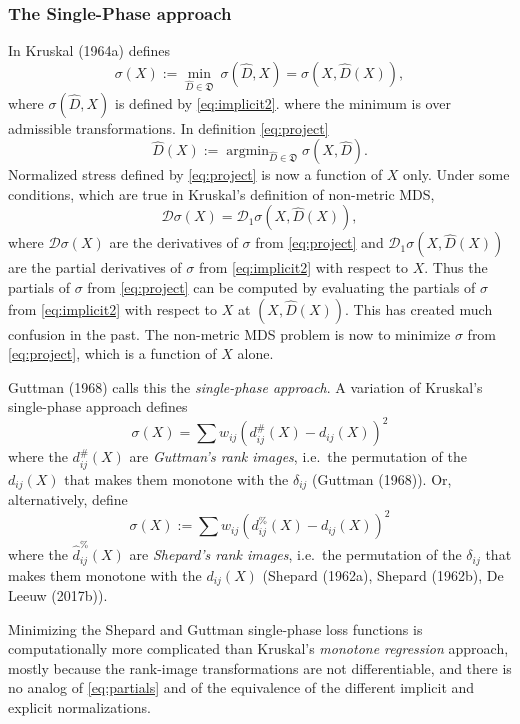\documentclass[
  12pt,
]{article}
\begin{document}
\subsubsection{The Single-Phase approach}\label{the-single-phase-approach}

In Kruskal (1964a) defines \begin{equation}
\sigma(X):=\min_{\hat D\in\mathfrak{D}}\ \sigma(\hat D,X)=\sigma(X,\hat D(X)),
\label{eq:project}
\end{equation} where \(\sigma(\hat D,X)\) is defined by
\eqref{eq:implicit2}. where the minimum is over admissible
transformations. In definition \eqref{eq:project} \begin{equation}
\hat D(X):=\mathop{\text{argmin}}_{\hat D\in\mathfrak{D}}\sigma(X, \hat D).
\label{eq:optscal}
\end{equation} Normalized stress defined by \eqref{eq:project} is now a
function of \(X\) only. Under some conditions, which are true in Kruskal's
definition of non-metric MDS, \begin{equation}
\mathcal{D}\sigma(X)=\mathcal{D}_1\sigma(X,\hat D(X)),
\label{eq:partials}
\end{equation} where \(\mathcal{D}\sigma(X)\) are the derivatives of
\(\sigma\) from \eqref{eq:project} and \(\mathcal{D}_1\sigma(X,\hat D(X))\)
are the partial derivatives of \(\sigma\) from \eqref{eq:implicit2} with
respect to \(X\). Thus the partials of \(\sigma\) from \eqref{eq:project} can
be computed by evaluating the partials of \(\sigma\) from
\eqref{eq:implicit2} with respect to \(X\) at \((X,\hat D(X))\). This has
created much confusion in the past. The non-metric MDS problem is now to
minimize \(\sigma\) from \eqref{eq:project}, which is a function of \(X\)
alone.

Guttman (1968) calls this the \emph{single-phase approach}. A variation of
Kruskal's single-phase approach defines \[
\sigma(X)=\sum   w_{ij}(d_{ij}^\#(X)-d_{ij}(X))^2
\] where the \(d_{ij}^\#(X)\) are \emph{Guttman's rank images}, i.e.~the
permutation of the \(d_{ij}(X)\) that makes them monotone with the
\(\delta_{ij}\) (Guttman (1968)). Or, alternatively, define \[
\sigma(X):=\sum   w_{ij}(d_{ij}^\%(X)-d_{ij}(X))^2
\] where the \(\hat d_{ij}^\%(X)\) are \emph{Shepard's rank images}, i.e.~the
permutation of the \(\delta_{ij}\) that makes them monotone with the
\(d_{ij}(X)\) (Shepard (1962a), Shepard (1962b), De Leeuw (2017b)).

Minimizing the Shepard and Guttman single-phase loss functions is
computationally more complicated than Kruskal's \emph{monotone regression}
approach, mostly because the rank-image transformations are not
differentiable, and there is no analog of \eqref{eq:partials} and of the
equivalence of the different implicit and explicit normalizations.
\end{document}
